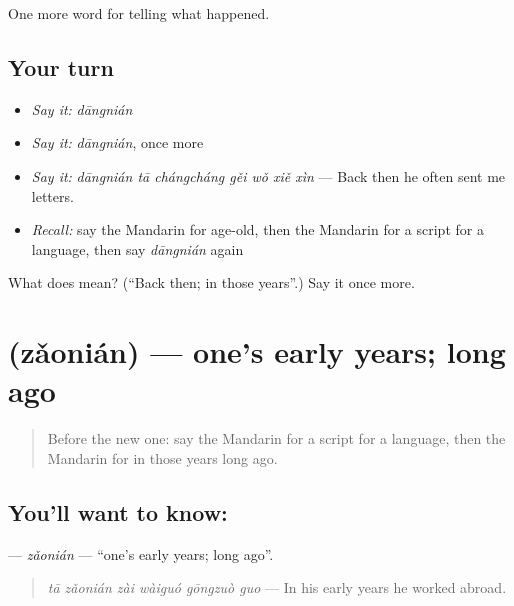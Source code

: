 \begin{grammarlens}[title={What you've built}]
One more word for telling what happened.
\end{grammarlens}

\subsection*{Your turn}
\begin{itemize}
\raggedright
  \item \emph{Say it:} \emph{dāngnián}
  \item \emph{Say it:} \emph{dāngnián}, once more
  \item \emph{Say it:} \emph{dāngnián tā chángcháng gěi wǒ xiě xìn} — Back then he often sent me letters.
  \item \emph{Recall:} say the Mandarin for age-old, then the Mandarin for a script for a language, then say \emph{dāngnián} again
\end{itemize}

\begin{tcolorbox}[breakable,colback=teal!4,colframe=teal!35!black,title={Before you move on}]
What does  mean? (\textquotedblleft{}Back then; in those years\textquotedblright{}.) Say it once more.
\end{tcolorbox}
\section[\texorpdfstring{\zh{早年} (zǎonián)}{早年 (zǎonián)}]{ (zǎonián) — one's early years; long ago}

\label{lesson:ZH-C322-zaonian}



\begin{quote}
Before the new one: say the Mandarin for a script for a language, then the Mandarin for in those years long ago.
\end{quote}

\subsection*{You'll want to know: }
\textbf{} — \emph{zǎonián} — \textquotedblleft{}one's early years; long ago\textquotedblright{}.

\begin{quote}
\textbf{} \emph{tā zǎonián zài wàiguó gōngzuò guo} — In his early years he worked abroad.
\end{quote}

